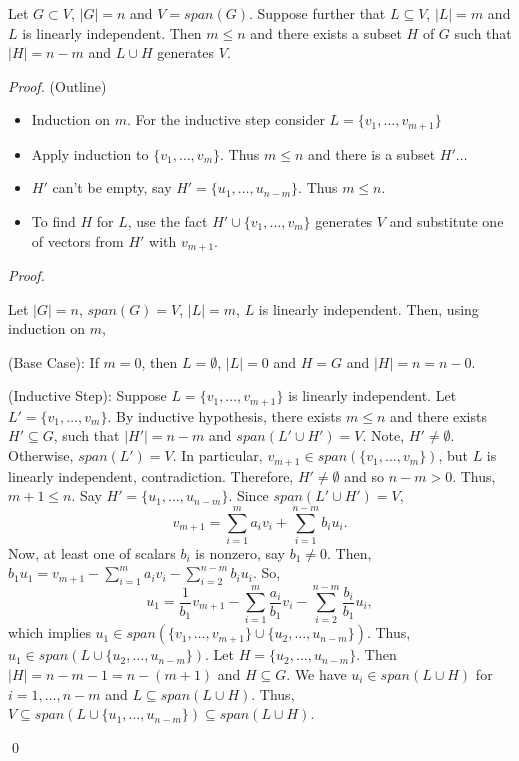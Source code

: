 \documentclass[12pt]{article}
\newenvironment{theorem}[2][Theorem]{\begin{trivlist}
\item[\hskip \labelsep {\bfseries #1}\hskip \labelsep {\bfseries #2.}]}{\end{trivlist}}
\newenvironment{sol}
    {\emph{Proof.}
    }
    {
    \qed
    }
\begin{document}
\begin{theorem}{1.10}
Let $G \subset V$, $\left| G \right| = n$ and $V = span(G)$. Suppose further that $L \subseteq V$, $\left| L \right| = m$ and $L$ is linearly independent. Then $m \leq n$ and there exists a subset $H$ of $G$ such that $\left| H \right| = n - m$ and $L \cup H$ generates $V$.
\end{theorem}

\textit{Proof.} (Outline)
\begin{itemize}
    \item Induction on $m$. For the inductive step consider $L = \{v_1, \dots, v_{m+1}\}$
    \item Apply induction to $\{v_1, \dots, v_m\}$. Thus $m \leq n$ and there is a subset $H' \dots$
    \item $H'$ can't be empty, say $H' = \{u_1, \dots, u_{n-m}\}$. Thus $m \leq n$.
    \item To find $H$ for $L$, use the fact $H' \cup \{v_1, \dots, v_m\}$ generates $V$ and substitute one of vectors from $H'$ with $v_{m+1}$.
\end{itemize}

\begin{sol}
Let $|G| = n$, $span(G) = V$, $|L| = m$, $L$ is linearly independent. Then, using induction on $m$,

(Base Case): If $m = 0$, then $L = \emptyset$, $|L| = 0$ and $H = G$ and $|H| = n = n - 0$.

(Inductive Step): Suppose $L = \{v_1, \dots, v_{m + 1}\}$ is linearly independent. Let $L' = \{v_1, \dots, v_m\}$. By inductive hypothesis, there exists $m \leq n$ and there exists $H' \subseteq G$, such that $|H'| = n - m$ and $span(L' \cup H') = V$. Note, $H' \neq \emptyset$. Otherwise, $span(L') = V$. In particular, $v_{m + 1} \in span(\{v_1, \dots, v_m\})$, but $L$ is linearly independent, contradiction. Therefore, $H' \neq \emptyset$ and so $n - m > 0$. Thus, $m + 1 \leq n$. Say $H' = \{u_1, \dots, u_{n-m}\}$. Since $span(L' \cup H') = V$, $$v_{m+1} = \sum_{i = 1}^ma_iv_i + \sum_{i = 1}^{n - m}b_iu_i.$$ Now, at least one of scalars $b_i$ is nonzero, say $b_1 \neq 0$. Then, $b_1u_1 = v_{m+1} - \sum_{i = 1}^ma_iv_i - \sum_{i = 2}^{n - m}b_iu_i$. So, $$u_1 = \frac{1}{b_1}v_{m+1} - \sum_{i = 1}^m\frac{a_i}{b_1}v_i - \sum_{i = 2}^{n - m}\frac{b_i}{b_1}u_i,$$ which implies $u_1 \in span(\{v_1, \dots, v_{m+1}\} \cup \{u_2, \dots, u_{n - m}\})$. Thus, $u_1 \in span(L \cup \{u_2, \dots, u_{n - m}\})$. Let $H = \{u_2, \dots, u_{n - m}\}$. Then $|H| = n - m - 1 = n - (m + 1)$ and $H \subseteq G$. We have $u_i \in span(L \cup H)$ for $i = 1, \dots, n-m$ and $L \subseteq span(L \cup H)$. Thus, $V \subseteq span(L \cup \{u_1, \dots, u_{n - m}\}) \subseteq span(L \cup H)$.
\end{sol}
\end{document}
